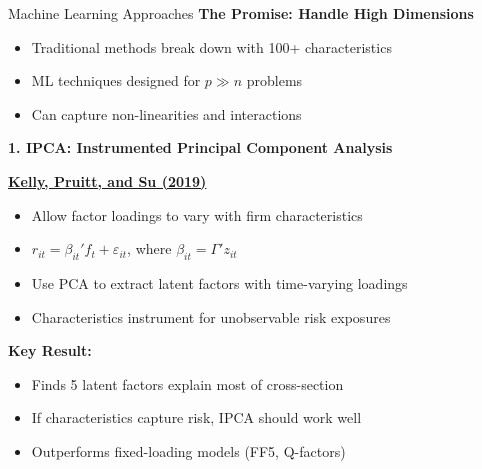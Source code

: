 \documentclass{beamer}
\begin{document}
\begin{frame}{Machine Learning Approaches}
    \textbf{The Promise: Handle High Dimensions}
    \begin{itemize}
        \item Traditional methods break down with 100+ characteristics
        \item ML techniques designed for $p \gg n$ problems
        \item Can capture non-linearities and interactions
    \end{itemize}
    
    
    \textbf{1. IPCA: Instrumented Principal Component Analysis}
    
    \textbf{\textcolor{blue}{\href{https://doi.org/10.1016/j.jfineco.2019.05.001}{Kelly, Pruitt, and Su (2019)}}}
    \begin{itemize}
        \item Allow factor loadings to vary with firm characteristics
        \item $r_{it} = \beta_{it}' f_t + \varepsilon_{it}$, where $\beta_{it} = \Gamma' z_{it}$
        \item Use PCA to extract latent factors with time-varying loadings
        \item Characteristics instrument for unobservable risk exposures
    \end{itemize}
    
    
    \textbf{Key Result:}
    \begin{itemize}
        \item Finds 5 latent factors explain most of cross-section
        \item If characteristics capture risk, IPCA should work well
        \item Outperforms fixed-loading models (FF5, Q-factors)
    \end{itemize}
\end{frame}
\end{document}
